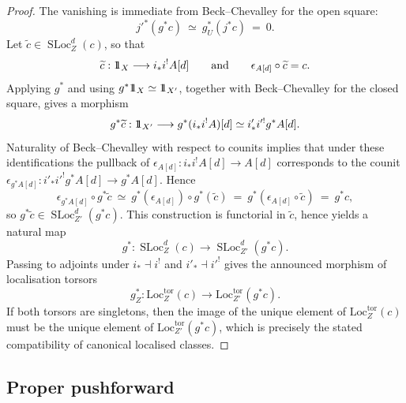 \documentclass[10pt,a4paper,dvipsnames,x11names]{amsart}
\newcommand{\one}{1\hskip-3.5pt1}
\newcommand{\Loc}{\mathrm{Loc}}
\newcommand{\SLoc}{\operatorname{SLoc}}
\numberwithin{equation}{section}
\theoremstyle{plain}
\theoremstyle{definition}
\theoremstyle{remark}
\begin{document}
\begin{proof}
The vanishing is immediate from Beck--Chevalley for the open square:
$$
j'^*(g^*c)\ \simeq\ g_U^*(j^*c)\ =\ 0.
$$
Let $\widetilde c\in \SLoc_Z^d(c)$, so that
$$
\widetilde c:\one_X\longrightarrow i_*i^!A[d]
\qquad\text{and}\qquad
\epsilon_{A[d]}\circ \widetilde c=c.
$$
Applying $g^*$ and using $g^*\one_X\simeq \one_{X'}$, together with Beck--Chevalley for the closed square, gives a morphism
$$
g^*\widetilde c:\one_{X'}\longrightarrow g^*(i_*i^!A)[d]\simeq i'_*i'^!g^*A[d].
$$
Naturality of Beck--Chevalley with respect to counits implies that under these identifications the pullback of
$\epsilon_{A[d]}:i_*i^!A[d]\to A[d]$
corresponds to the counit
$\epsilon_{g^*A[d]}:i'_*i'^!g^*A[d]\to g^*A[d]$.
Hence
$$
\epsilon_{g^*A[d]}\circ g^*\widetilde c
\ \simeq\
g^*(\epsilon_{A[d]})\circ g^*(\widetilde c)
\ =\
g^*(\epsilon_{A[d]}\circ \widetilde c)
\ =\
g^*c,
$$
so $g^*\widetilde c\in \SLoc_{Z'}^d(g^*c)$. This construction is functorial in $\widetilde c$, hence yields a natural map
$$
g^*: \SLoc_Z^d(c)\longrightarrow \SLoc_{Z'}^d(g^*c).
$$
Passing to adjoints under $i_*\dashv i^!$ and $i'_*\dashv i'^!$ gives the announced morphism of localisation torsors
$$
g_Z^*:\Loc_Z^{\mathrm{tor}}(c)\longrightarrow \Loc_{Z'}^{\mathrm{tor}}(g^*c).
$$
If both torsors are singletons, then the image of the unique element of $\Loc_Z^{\mathrm{tor}}(c)$ must be the unique element of $\Loc_{Z'}^{\mathrm{tor}}(g^*c)$, which is precisely the stated compatibility of canonical localised classes.
\end{proof}

\subsection{Proper pushforward}
\end{document}
